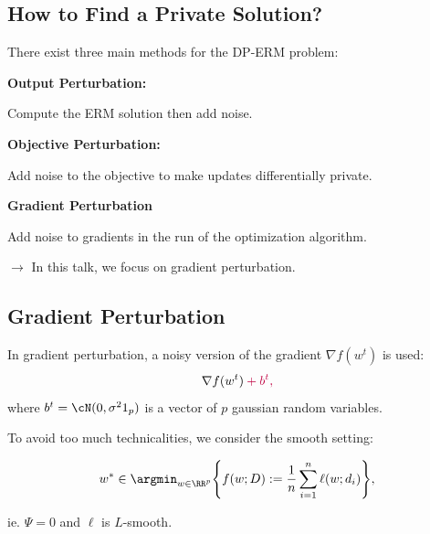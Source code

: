\documentclass[notheorems]{beamer}
\begin{document}
\subsection{How to Find a Private Solution?}
\label{sub:how_to_find_a_private_solution_}


\begin{frame}
  There exist three main methods for the DP-ERM problem:

  \textbf{Output Perturbation:}

  \quad Compute the ERM solution then add noise.

  \textbf{Objective Perturbation:}

  \quad Add noise to the objective to make updates differentially private.

  \textbf{Gradient Perturbation}

  \quad Add noise to gradients in the run of the optimization algorithm.

  \vspace{1em}

  \quad $\rightarrow$ In this talk, we focus on gradient perturbation.
\end{frame}

\subsection{Gradient Perturbation}
\label{sub:gradient_perturbation}

\begin{frame}
  In gradient perturbation, a noisy version of the gradient $\nabla f(w^t)$ is used:
  \begin{align*}
    \nabla f(w^t) \color{purple} + b^t,
  \end{align*}
  where $b^t = \cN(0, \sigma^2 1_p)$ is a vector of $p$ gaussian random variables.
\end{frame}

\begin{frame}
  To avoid too much technicalities, we consider the smooth setting:

  \begin{align}
    w^* \in \argmin_{w \in \RR^p} \Bigg\{ f(w; D) := \frac 1n \sum_{i=1}^n \ell(w; d_i) \Bigg\},
  \end{align}

  ie. $\Psi = 0$ and $\ell$ is $L$-smooth.
\end{frame}
\end{document}
